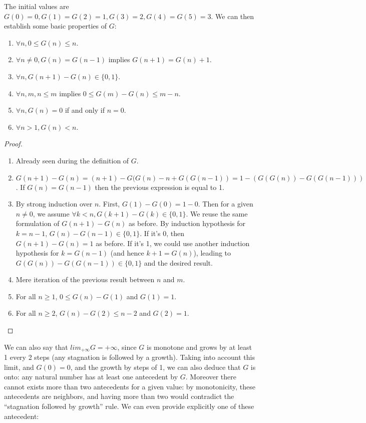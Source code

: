 \documentclass[a4paper,11pt]{article}
\begin{document}
The initial values are $G(0)=0, G(1)=G(2)=1, G(3)=2, G(4)=G(5)=3$.
We can then establish some basic properties of $G$:
\begin{theorem}\label{Gprops}
\noindent
\begin{enumerate}
\item $\forall n, 0 \le G(n) \le n$.
\item $\forall n\neq 0, G(n)=G(n-1)$ implies $G(n+1)=G(n)+1$.
\item $\forall n, G(n+1)-G(n) \in \{0,1\}$.
\item $\forall n,m, n\le m$ implies $0 \le G(m)-G(n) \le m-n$.
\item $\forall n, G(n)=0$ if and only if $n=0$.
\item $\forall n>1, G(n)<n$.
\end{enumerate}
\end{theorem}
\begin{proof}
\noindent
\begin{enumerate}
\item Already seen during the definition of $G$.
\item $G(n+1)-G(n) = (n+1)-G(G(n)-n+G(G(n-1)) = 1 - (G(G(n))-G(G(n-1)))$.
If $G(n)=G(n-1)$ then the previous expression is equal to 1.
\item By strong induction over $n$. First, $G(1)-G(0)=1-0$. Then
for a given $n\neq 0$, we assume $\forall k<n, G(k+1)-G(k) \in \{0,1\}$.
We reuse the same formulation of $G(n+1)-G(n)$ as before.
By induction hypothesis for $k=n-1$, $G(n)-G(n-1) \in\{0,1\}$.
If it's 0, then $G(n+1)-G(n) = 1$ as before. If it's 1, we could use another
induction hypothesis for $k=G(n-1)$ (and hence $k+1 = G(n)$), leading
to $G(G(n))-G(G(n-1)) \in \{0,1\}$ and the desired result.
\item Mere iteration of the previous result between $n$ and $m$.
\item For all $n\ge 1$, $0 \le G(n)-G(1)$ and $G(1)=1$.
\item For all $n\ge 2$, $G(n)-G(2) \le n-2$ and $G(2)=1$.
\end{enumerate}
\end{proof}

We can also say that $lim_{+\infty} G = +\infty$, since $G$ is
monotone and grows by at least 1 every 2 steps (any stagnation
is followed by a growth). Taking into account this limit, and
$G(0)=0$, and the growth by steps of 1, we can also deduce
that $G$ is onto: any natural number has at least one antecedent
by $G$. Moreover there cannot exists more than two antecedents
for a given value: by monotonicity, these antecedents are neighbors,
and having more than two would contradict the ``stagnation followed
by growth'' rule.
We can even provide explicitly one of these antecedent:
\end{document}
